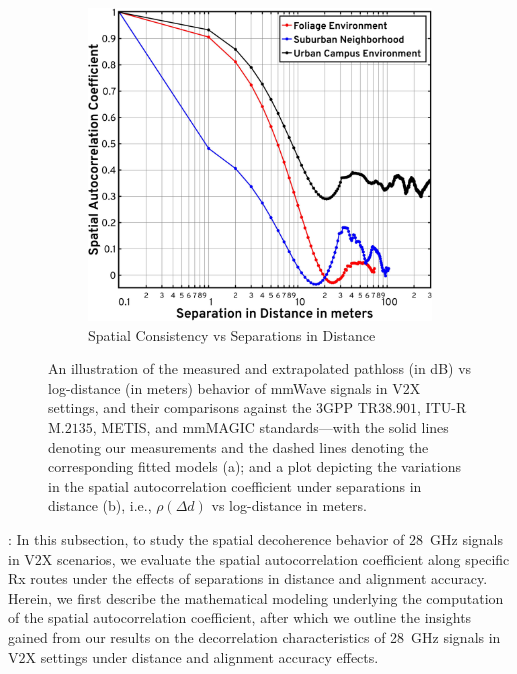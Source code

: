 \documentclass[12pt, draftcls, onecolumn]{IEEEtran}
\begin{document}
{\begin{figure} [t]
    \begin{subfigure}{0.5\linewidth}
        \centering
        \includegraphics[width=1.0\linewidth]{figs/spatial_consistency_vs_distance.pdf}
        \caption{Spatial Consistency vs Separations in Distance}
        \label{F7b}
    \end{subfigure}
    \vspace{-8mm}
    \caption{An illustration of the measured and extrapolated pathloss (in dB) vs log-distance (in meters) behavior of mmWave signals in V$2$X settings, and their comparisons against the $3$GPP TR$38.901$, ITU-R M.$2135$, METIS, and mmMAGIC standards---with the solid lines denoting our measurements and the dashed lines denoting the corresponding fitted models (a); and a plot depicting the variations in the spatial autocorrelation coefficient under separations in distance (b), i.e., $\rho(\Delta d)$ vs log-distance in meters.}
    \label{F7}
\end{figure}

: In this subsection, to study the spatial decoherence behavior of \SI{28}{\giga\hertz} signals in V$2$X scenarios, we evaluate the spatial autocorrelation coefficient along specific Rx routes under the effects of separations in distance and alignment accuracy. Herein, we first describe the mathematical modeling underlying the computation of the spatial autocorrelation coefficient, after which we outline the insights gained from our results on the decorrelation characteristics of \SI{28}{\giga\hertz} signals in V$2$X settings under distance and alignment accuracy effects.

}
\end{document}
